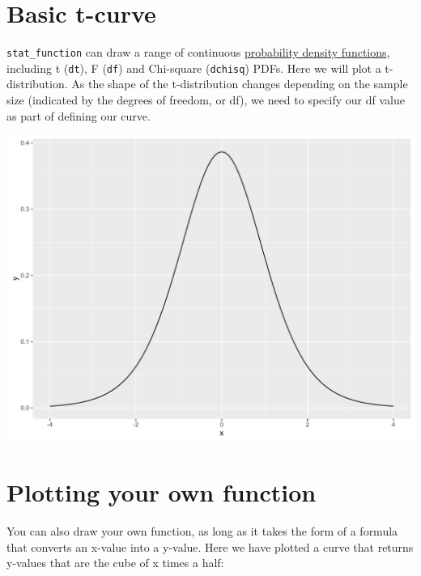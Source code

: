 \section{Basic t-curve}\label{basic-t-curve}

\texttt{stat\_function} can draw a range of continuous
\href{https://en.wikipedia.org/wiki/Probability_density_function}{probability
density functions}, including t (\texttt{dt}), F (\texttt{df}) and
Chi-square (\texttt{dchisq}) PDFs. Here we will plot a t-distribution.
As the shape of the t-distribution changes depending on the sample size
(indicated by the degrees of freedom, or df), we need to specify our df
value as part of defining our curve.

\begin{Shaded}
\begin{Highlighting}[]
\StringTok{ }\NormalTok{(}\NormalTok{(} \NormalTok{(-}\NormalTok{, }\NormalTok{)), }\NormalTok{(} 
\StringTok{      }\NormalTok{(}  \NormalTok{(} \NormalTok{))}
\end{Highlighting}
\end{Shaded}

\begin{center}\includegraphics[width=0.55\linewidth]{figures/function_2-1} \end{center}

\section{Plotting your own
function}\label{plotting-your-own-function}

You can also draw your own function, as long as it takes the form of a
formula that converts an x-value into a y-value. Here we have plotted a
curve that returns y-values that are the cube of x times a half:

